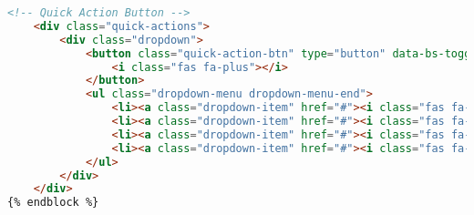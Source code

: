 \begin{lstlisting}[language=HTML]
    <!-- Quick Action Button -->
    <div class="quick-actions">
        <div class="dropdown">
            <button class="quick-action-btn" type="button" data-bs-toggle="dropdown" aria-expanded="false">
                <i class="fas fa-plus"></i>
            </button>
            <ul class="dropdown-menu dropdown-menu-end">
                <li><a class="dropdown-item" href="#"><i class="fas fa-exchange-alt me-2"></i> New Transfer</a></li>
                <li><a class="dropdown-item" href="#"><i class="fas fa-credit-card me-2"></i> Pay Bill</a></li>
                <li><a class="dropdown-item" href="#"><i class="fas fa-mobile-alt me-2"></i> Mobile Deposit</a></li>
                <li><a class="dropdown-item" href="#"><i class="fas fa-user-friends me-2"></i> Send to Friend</a></li>
            </ul>
        </div>
    </div>
{% endblock %}
\end{lstlisting}
